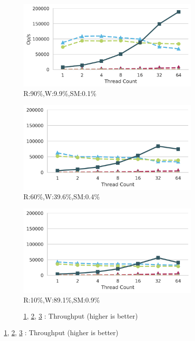 \begin{figure}[ht]
	\centering
	\captionsetup{justification=centering}
		\begin{subfigure}[b]{.33\textwidth}
			\includegraphics[width=\textwidth]{figures/PerformanceCharts/ReadWithModificationsThroughput}
			\caption{R:90\%,W:9.9\%,SM:0.1\%}
			\label{rm}
		\end{subfigure}
		\begin{subfigure}[b]{.325\textwidth}
			\includegraphics[width=\textwidth]{figures/PerformanceCharts/BalancedWithModificationsThroughput}
			\caption{R:60\%,W:39.6\%,SM:0.4\%}
			\label{bm}
		\end{subfigure}
		\begin{subfigure}[b]{.325\textwidth}
			\includegraphics[width=\textwidth]{figures/PerformanceCharts/WriteWithModificationsThroughput}
			\caption{R:10\%,W:89.1\%,SM:0.9\%}
			\label{wm}
		\end{subfigure}
		\begin{subfigure}[b]{\textwidth}
			\caption*{\ref{rm}, \ref{bm}, \ref{wm} : Throughput (higher is better)}
		\end{subfigure}
	

\end{figure}
